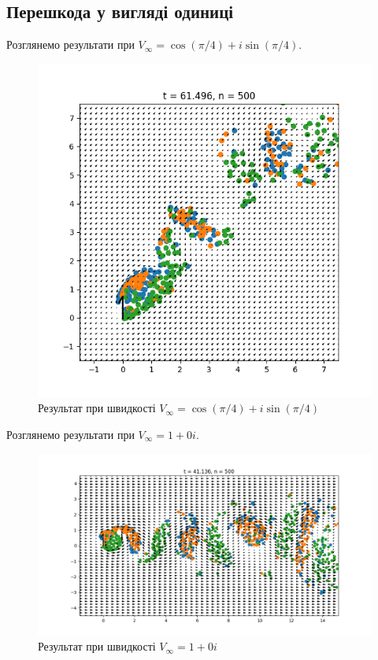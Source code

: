 \documentclass[a4paper,12pt]{article}
\begin{document}
	\subsection{Перешкода у вигляді одиниці}
	
		Розглянемо результати при $V_{\infty} = \cos(\pi/4) + i\sin(\pi/4)$.
	
		\begin{figure}[ht]
			\begin{center}\includegraphics[scale=0.5]{result_one1} \end{center}
			\caption{Результат при швидкості $V_{\infty} = \cos(\pi/4) + i\sin(\pi/4)$}
			\label{fig:result_one1}
		\end{figure}
	
		Розглянемо результати при $V_{\infty} = 1 + 0i$.
		\newpage
		
		\begin{figure}[ht]
			\begin{center}\includegraphics[scale=0.5]{result_one2} \end{center}
			\caption{Результат при швидкості $V_{\infty} = 1 +0i$}
			\label{fig:result_one2}
		\end{figure}
		
\end{document}
